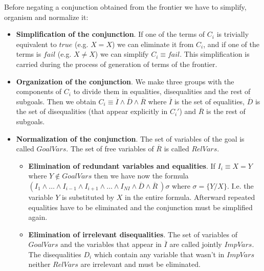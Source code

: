 \documentclass{llncs}
\begin{document}

Before negating a conjunction obtained from the frontier we have to
simplify, organism and normalize it:

\begin{itemize}

\item {\bf Simplification of the conjunction}. If one of the terms of
$C_i$ is trivially equivalent to 
$true$ (e.g. $X=X$) we can eliminate it from $C_i$, and if
one of the terms is $fail$ (e.g. $X \neq X$) we can simplify $C_i
\equiv fail$. This simplification is carried during the process
of generation of terms of the frontier.

\item {\bf Organization of the conjunction}. We make three groups with
the components of $C_i$ to divide them in equalities, disequalities
and the rest of subgoals. Then we obtain $C_i \equiv \overline{I}
\wedge \overline{D} \wedge \overline{R}$ where $\overline{I}$ is the
set of equalities, $\overline{D}$ is the set of disequalities (that
appear explicitly in $C_i'$) and $\overline{R}$ is the rest of subgoals.
  
\item {\bf Normalization of the conjunction}. The set of variables of the
goal is called $GoalVars$. The set of free variables of $\overline{R}$
is called $RelVars$.

    \begin{itemize}


       \item {\bf Elimination of redundant variables and
       equalities}. If $I_i \equiv X = Y$ where $Y \not\in GoalVars$
       then we have now the formula $ ( I_1 \wedge \ldots \wedge
       I_{i-1} \wedge I_{i+1} \wedge \ldots \wedge I_{NI} \wedge
       \overline{D} \wedge \overline{R}~) \sigma $ where $ \sigma = \{
       Y / X \}$. I.e. the variable $Y$ is substituted by $X$ in the
       entire formula. Afterward repeated equalities have to be
       eliminated and the conjunction must be simplified again.

       \item {\bf Elimination of irrelevant disequalities}. The set of
       variables of $GoalVars$ and the variables that appear in
       $\overline{I}$ are called jointly $ImpVars$. The disequalities
       $D_i$ which contain any variable that wasn't in $ImpVars$
       neither $RelVars$ are irrelevant and must be eliminated.

    \end{itemize}

 \end{itemize}
\end{document}
